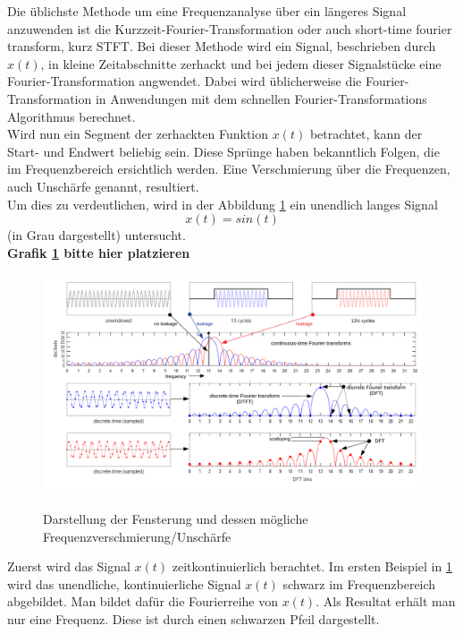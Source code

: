 
Die üblichste Methode um eine Frequenzanalyse über ein längeres Signal anzuwenden ist die  Kurzzeit-Fourier-Transformation oder auch short-time fourier transform, kurz STFT. Bei dieser Methode wird ein Signal, beschrieben durch $x(t)$, in kleine Zeitabschnitte zerhackt und bei jedem dieser Signalstücke eine Fourier-Transformation angwendet. Dabei wird üblicherweise die Fourier-Transformation in Anwendungen mit dem schnellen Fourier-Transformations Algorithmus berechnet.\\

Wird nun ein Segment der zerhackten Funktion $x(t)$ betrachtet, kann der Start- und Endwert beliebig sein. Diese Sprünge haben bekanntlich Folgen, die im Frequenzbereich ersichtlich werden. Eine Verschmierung über die Frequenzen, auch Unschärfe genannt, resultiert. \\

Um dies zu verdeutlichen, wird in der Abbildung \ref{fig:Spectral} ein unendlich langes Signal 
\[x(t)=sin(t)\]
(in Grau dargestellt) untersucht. \\

\color{red}\textbf{Grafik \ref{fig:Spectral} bitte hier platzieren} \color{black} %
\begin{figure}[h]
	\centering
	\includegraphics[scale=0.8]{papers/autotune/sections/fft/images/windows/Spectral.pdf}
	\caption{Darstellung der Fensterung und dessen mögliche Frequenzverschmierung/Unschärfe}\cite{wikipedia:Window}
	\label{fig:Spectral}
\end{figure}%

Zuerst wird das Signal $x(t)$ zeitkontinuierlich berachtet. Im ersten Beispiel in \ref{fig:Spectral} wird das unendliche, kontinuierliche Signal $x(t)$ schwarz im Frequenzbereich abgebildet. Man bildet dafür die Fourierreihe von $x(t)$. Als Resultat erhält man nur eine Frequenz. Diese ist durch einen schwarzen Pfeil dargestellt.\\

